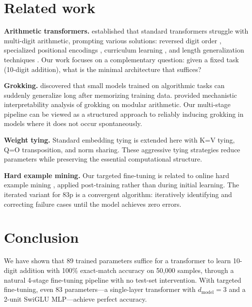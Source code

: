 \documentclass[11pt]{article}
\begin{document}
\section{Related work}
\label{sec:related}

\textbf{Arithmetic transformers.} \citet{nogueira2021investigating}
established that standard transformers struggle with multi-digit
arithmetic, prompting various solutions: reversed digit order
\citep{zhangli2024reverse}, specialized positional encodings
\citep{mcleish2024transformers}, curriculum learning
\citep{lee2024teaching}, and length generalization techniques
\citep{jelassi2023length, zhou2024what}. Our work focuses on a
complementary question: given a fixed task (10-digit addition), what is
the minimal architecture that suffices?

\textbf{Grokking.} \citet{power2022grokking} discovered that small
models trained on algorithmic tasks can suddenly generalize long after
memorizing training data. \citet{nanda2023grokking} provided mechanistic
interpretability analysis of grokking on modular arithmetic. Our
multi-stage pipeline can be viewed as a structured approach to reliably
inducing grokking in models where it does not occur spontaneously.

\textbf{Weight tying.} Standard embedding tying
\citep{vaswani2017attention} is extended here with K=V tying, Q=O
transposition, and norm sharing. These aggressive tying strategies reduce
parameters while preserving the essential computational structure.

\textbf{Hard example mining.} Our targeted fine-tuning is related to
online hard example mining \citep{shrivastava2016training}, applied
post-training rather than during initial learning. The iterated variant
for 83p is a convergent algorithm: iteratively identifying and correcting
failure cases until the model achieves zero errors.

\section{Conclusion}
\label{sec:conclusion}

We have shown that 89 trained parameters suffice for a transformer to
learn 10-digit addition with 100\% exact-match accuracy on 50,000
samples, through a natural 4-stage fine-tuning pipeline with no test-set
intervention. With targeted fine-tuning, even 83 parameters---a
single-layer transformer with $d_\text{model}=3$ and a 2-unit SwiGLU
MLP---achieve perfect accuracy.
\end{document}
